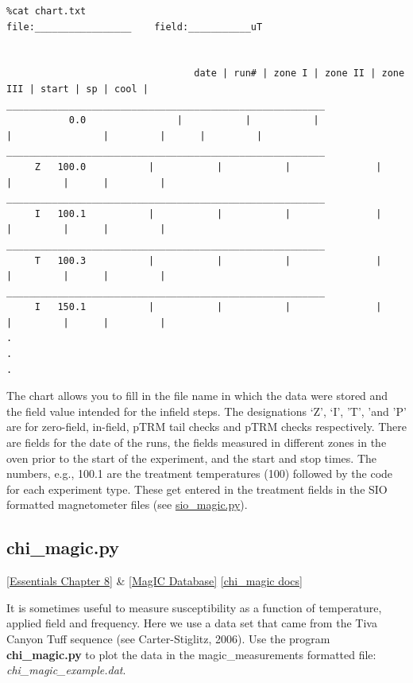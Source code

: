 \documentclass[11pt]{book}
\begin{document}
{{\begin{verbatim}
%cat chart.txt
file:_________________    field:___________uT


                                 date | run# | zone I | zone II | zone III | start | sp | cool |
________________________________________________________
		   0.0	              |           |           |               |                |         |      |         |
________________________________________________________
	 Z 	 100.0           |           |           |               |                |         |      |         |
________________________________________________________
	 I 	 100.1           |           |           |               |                |         |      |         |
________________________________________________________
	 T 	 100.3           |           |           |               |                |         |      |         |
________________________________________________________
	 I 	 150.1           |           |           |               |                |         |      |         |
.
.
.

\end{verbatim}

The chart allows you to fill in the file name in which the data were stored and the field value intended for the
infield steps.  The designations `Z', `I', 'T', 'and 'P'  are for zero-field, in-field, pTRM tail checks and pTRM checks respectively.  There are fields for the date of the runs, the fields measured in different zones in the oven prior to the start of the experiment, and the start and stop times.  The numbers, e.g., 100.1 are the treatment temperatures (100) followed by the code for each experiment type.  These get entered in the treatment fields in the SIO formatted magnetometer files (see \href{#SIO_magic}{sio\_magic.py}).



\subsection{chi\_magic.py}
\href{http://earthref.org/MAGIC/books/Tauxe/Essentials/WebBook3ch8.html#ch8}{[Essentials Chapter 8]} \& \href{#MagICDatabase}{[MagIC Database]}\label{ex:chi_magic}
\href{https://github.com/PmagPy/PmagPy/blob/master/programs/chi_magic.py}{[chi\_magic docs]}

It is sometimes useful to measure susceptibility as a function of temperature, applied field and frequency.   Here we use a data set that came from the Tiva Canyon Tuff sequence (see Carter-Stiglitz,  2006).  \nocite{carterstiglitz06}    Use the program {\bf chi\_magic.py} to plot the data in the magic\_measurements formatted file: {\it chi\_magic\_example.dat}.

}}
\end{document}
